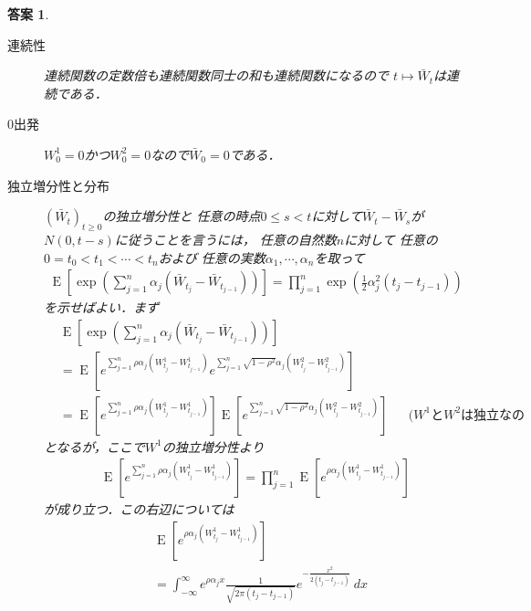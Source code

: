 \documentclass[11pt,a4paper]{jsarticle}
\theoremstyle{mystyle}
\newtheorem*{ans}{答案}
\begin{document}
\begin{ans}\mbox{}
	\begin{description}
		\item[連続性]
			連続関数の定数倍も連続関数同士の和も連続関数になるので
			$t \longmapsto \bar{W}_{t}$は連続である．
			
		\item[$0$出発]
			$W^{1}_{0} = 0$かつ$W^{2}_{0} = 0$なので$\bar{W}_{0} = 0$である．
			
		\item[独立増分性と分布]
			$(\bar{W}_{t})_{t \geq 0}$の独立増分性と
			任意の時点$0 \leq s < t$に対して$\bar{W}_{t} - \bar{W}_{s}$が
			$N(0,t-s)$に従うことを言うには，
			任意の自然数$n$に対して
			任意の$0 = t_{0} < t_{1} < \cdots < t_{n}$および
			任意の実数$\alpha_{1},\cdots,\alpha_{n}$を取って
			\begin{align}
				\operatorname{E}\left[\exp{\left(\sum_{j=1}^{n}\alpha_{j}(\bar{W}_{t_{j}} - \bar{W}_{t_{j-1}})\right)}\right]
				= \prod_{j=1}^{n} \exp{\left(\frac{1}{2}\alpha_{j}^{2}(t_{j}-t_{j-1})\right)}
			\end{align}
			を示せばよい．まず
			\begin{align}
				&\operatorname{E}\left[\exp{\left(\sum_{j=1}^{n}\alpha_{j}(\bar{W}_{t_{j}} - \bar{W}_{t_{j-1}})\right)}\right] \\
				&= \operatorname{E}\left[e^{\sum_{j=1}^{n}\rho\alpha_{j}(W^{1}_{t_{j}} - W^{1}_{t_{j-1}})}e^{\sum_{j=1}^{n}\sqrt{1-\rho^{2}}\alpha_{j}(W^{2}_{t_{j}} - W^{2}_{t_{j-1}})}\right] \\
				&=  \operatorname{E}\left[e^{\sum_{j=1}^{n}\rho\alpha_{j}(W^{1}_{t_{j}} - W^{1}_{t_{j-1}})}\right] \operatorname{E}\left[e^{\sum_{j=1}^{n}\sqrt{1-\rho^{2}}\alpha_{j}(W^{2}_{t_{j}} - W^{2}_{t_{j-1}})}\right] && \mbox{($W^{1}$と$W^{2}$は独立なので)}
			\end{align}
			となるが，ここで$W^{1}$の独立増分性より
			\begin{align}
				\operatorname{E}\left[e^{\sum_{j=1}^{n}\rho\alpha_{j}(W^{1}_{t_{j}} - W^{1}_{t_{j-1}})}\right] 
				= \prod_{j=1}^{n} \operatorname{E}\left[e^{\rho\alpha_{j}(W^{1}_{t_{j}} - W^{1}_{t_{j-1}})}\right]
			\end{align}
			が成り立つ．この右辺については
			\begin{align}
				&\operatorname{E}\left[e^{\rho\alpha_{j}(W^{1}_{t_{j}} - W^{1}_{t_{j-1}})}\right] \\
				&= \int_{-\infty}^{\infty} e^{\rho\alpha_{j}x}\frac{1}{\sqrt{2\pi(t_{j}-t_{j-1})}}e^{-\frac{x^{2}}{2(t_{j}-t_{j-1})}}\ dx \\

\end{align}
\end{description}
\end{ans}
\end{document}
